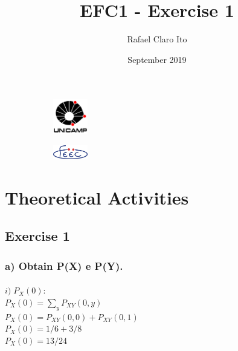 \documentclass[a4paper]{article}
\begin{document}
\begin{figure}
    \centering
    \begin{subfigure}{0.45\textwidth}
        \centering
        \includegraphics[width=1.5cm]{unicamp}
        \label{fig:unicamp}
    \end{subfigure}
    \hfill
    \begin{subfigure}{0.45\textwidth}
        \centering
        \includegraphics[width=1.5cm]{feec}
        \label{fig:feec}
    \end{subfigure}
\end{figure}

\title{EFC1 - Exercise 1}
\author{Rafael Claro Ito}
\date{September 2019}
\maketitle
\newpage

\section{Theoretical Activities}

\subsection{Exercise 1}

\subsubsection{a) Obtain P(X) e P(Y).}

\paragraph{$i) \; P_X(0):                       $
\\
$ \displaystyle P_X(0) = \sum_{y} P_{XY}(0,y)   $\\
$ P_X(0) = P_{XY}(0,0) + P_{XY}(0,1)            $\\
$ P_X(0) = 1/6 + 3/8                            $\\
$ \boxed{ P_X(0) = 13/24 }                      $\\
}
\end{document}
